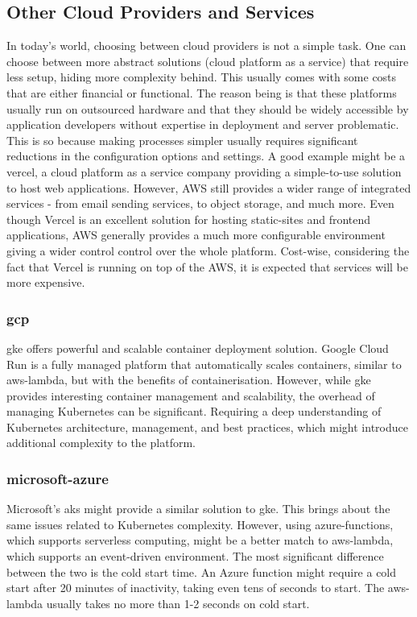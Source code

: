 \subsection{Other Cloud Providers and Services}
\label{subsec:other-cloud-providers}
In today's world, choosing between cloud providers is not a simple task.
One can choose between more abstract solutions (cloud platform as a service) that require less setup, hiding more complexity behind.
This usually comes with some costs that are either financial or functional.
The reason being is that these platforms usually run on outsourced hardware and that they should be widely accessible by application developers without expertise in deployment and server problematic. 
This is so because making processes simpler usually requires significant reductions in the configuration options and settings. 
A good example might be a \gls{vercel}, a cloud platform as a service company providing a simple-to-use solution to host web applications.
However, AWS still provides a wider range of integrated services - from email sending services, to object storage, and much more.
Even though Vercel is an excellent solution for hosting static-sites and frontend applications, AWS generally provides a much more configurable environment giving a wider control control over the whole platform.
Cost-wise, considering the fact that Vercel is running on top of the AWS, it is expected that services will be more expensive.

\subsubsection{\gls{gcp}}
\gls{gke} offers powerful and scalable container deployment solution.
Google Cloud Run is a fully managed platform that automatically scales containers, similar to \gls{aws-lambda}, but with the benefits of containerisation. 
However, while \gls{gke} provides interesting container management and scalability, the overhead of managing Kubernetes can be significant.
Requiring a deep understanding of Kubernetes architecture, management, and best practices, which might introduce additional complexity to the platform.

\subsubsection{\gls{microsoft-azure}}
Microsoft's \gls{aks} might provide a similar solution to \gls{gke}.
This brings about the same issues related to Kubernetes complexity.
However, using \gls{azure-functions}, which supports serverless computing, might be a better match to \gls{aws-lambda}, which supports an event-driven environment.
The most significant difference between the two is the cold start time.
An Azure function might require a cold start after 20 minutes of inactivity, taking even tens of seconds to start.
The \gls{aws-lambda} usually takes no more than 1-2 seconds on cold start.


